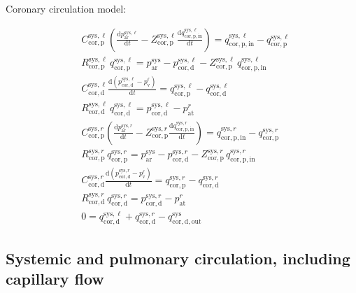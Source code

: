 \documentclass[a4paper,12pt]{report}
\begin{document}
Coronary circulation model:

\begin{align}
&C_{\mathrm{cor,p}}^{\mathrm{sys},\ell} \left(\frac{\mathrm{d}p_{\mathrm{ar}}^{\mathrm{sys},\ell}}{\mathrm{d}t}-Z_{\mathrm{cor,p}}^{\mathrm{sys},\ell}\frac{\mathrm{d}q_{\mathrm{cor,p,in}}^{\mathrm{sys},\ell}}{\mathrm{d}t}\right) = q_{\mathrm{cor,p,in}}^{\mathrm{sys},\ell} - q_{\mathrm{cor,p}}^{\mathrm{sys},\ell}\nonumber\\
&R_{\mathrm{cor,p}}^{\mathrm{sys},\ell}\,q_{\mathrm{cor,p}}^{\mathrm{sys},\ell}=p_{\mathrm{ar}}^{\mathrm{sys}}-p_{\mathrm{cor,d}}^{\mathrm{sys},\ell} - Z_{\mathrm{cor,p}}^{\mathrm{sys},\ell}\,q_{\mathrm{cor,p,in}}^{\mathrm{sys},\ell}\nonumber\\
&C_{\mathrm{cor,d}}^{\mathrm{sys},\ell} \frac{\mathrm{d}(p_{\mathrm{cor,d}}^{\mathrm{sys},\ell}-p_{\mathrm{v}}^{\ell})}{\mathrm{d}t} = q_{\mathrm{cor,p}}^{\mathrm{sys},\ell} - q_{\mathrm{cor,d}}^{\mathrm{sys},\ell}\nonumber\\
&R_{\mathrm{cor,d}}^{\mathrm{sys},\ell}\,q_{\mathrm{cor,d}}^{\mathrm{sys},\ell}=p_{\mathrm{cor,d}}^{\mathrm{sys},\ell}-p_{\mathrm{at}}^{r}\nonumber\\
&C_{\mathrm{cor,p}}^{\mathrm{sys},r} \left(\frac{\mathrm{d}p_{\mathrm{ar}}^{\mathrm{sys},r}}{\mathrm{d}t}-Z_{\mathrm{cor,p}}^{\mathrm{sys},r}\frac{\mathrm{d}q_{\mathrm{cor,p,in}}^{\mathrm{sys},r}}{\mathrm{d}t}\right) = q_{\mathrm{cor,p,in}}^{\mathrm{sys},r} - q_{\mathrm{cor,p}}^{\mathrm{sys},r}\nonumber\\
&R_{\mathrm{cor,p}}^{\mathrm{sys},r}\,q_{\mathrm{cor,p}}^{\mathrm{sys},r}=p_{\mathrm{ar}}^{\mathrm{sys}}-p_{\mathrm{cor,d}}^{\mathrm{sys},r} - Z_{\mathrm{cor,p}}^{\mathrm{sys},r}\,q_{\mathrm{cor,p,in}}^{\mathrm{sys},r}\nonumber\\
&C_{\mathrm{cor,d}}^{\mathrm{sys},r} \frac{\mathrm{d}(p_{\mathrm{cor,d}}^{\mathrm{sys},r}-p_{\mathrm{v}}^{\ell})}{\mathrm{d}t} = q_{\mathrm{cor,p}}^{\mathrm{sys},r} - q_{\mathrm{cor,d}}^{\mathrm{sys},r}\nonumber\\
&R_{\mathrm{cor,d}}^{\mathrm{sys},r}\,q_{\mathrm{cor,d}}^{\mathrm{sys},r}=p_{\mathrm{cor,d}}^{\mathrm{sys},r}-p_{\mathrm{at}}^{r}\nonumber\\
&0=q_{\mathrm{cor,d}}^{\mathrm{sys},\ell}+q_{\mathrm{cor,d}}^{\mathrm{sys},r}-q_{\mathrm{cor,d,out}}^{\mathrm{sys}}\nonumber
\end{align}





\subsection{Systemic and pulmonary circulation, including capillary flow}
\end{document}
